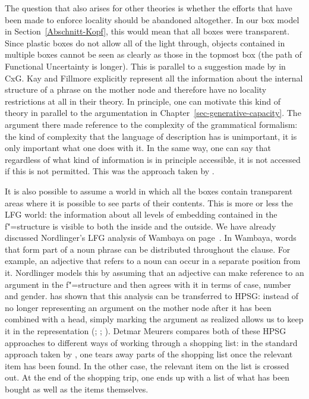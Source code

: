 The question that also arises for other theories is whether the efforts that have been made to enforce locality should be abandoned altogether.
In our box model in Section~\ref{Abschnitt-Kopf}, this would mean that all boxes were transparent. Since plastic boxes do not allow
all of the light through, objects contained in multiple boxes cannot be seen as clearly as those in the topmost box (the path
of Functional Uncertainty is longer). This is parallel to a suggestion made by
\citet{KF99a} in CxG\indexcxg. Kay and Fillmore explicitly represent all the information about the internal structure of a phrase on the mother
node and therefore have no locality restrictions at all in their theory. In principle, one can
motivate this kind of theory in parallel to the argumentation in Chapter~\ref{sec-generative-capacity}. The argument
there made reference to the complexity of the grammatical formalism: the kind of complexity that the
language of description has is unimportant, it is only important what one does with it. In the same way, one can say that regardless of what kind of information
is  in principle accessible, it is not accessed if this is not permitted. This was the approach taken by \citet[--145]{ps}.

It\label{page-Bender-Wambaya-two} is also possible to assume a world in which all the boxes contain transparent areas where it is possible to see parts of their contents.
This is more or less the LFG world\indexlfg: the information about all levels of embedding contained in the f"=structure is
visible to both the inside and the outside. We have already discussed Nordlinger's \citeyearpar{Nordlinger98a-u} LFG analysis of Wambaya 
on page~\pageref{Seite-Bender-Wambaya}.
In Wambaya, words that form part of a noun phrase can be distributed throughout the clause. For example, an adjective that refers to a noun
can occur in a separate position from it. Nordlinger models this by assuming that an adjective can make reference to an argument in the f"=structure
and then agrees with it in terms of case, number and gender. \citet{Bender2008a} has shown that this analysis can be transferred to HPSG\indexhpsg:
instead of no longer representing an argument on the mother node after it has been combined with a head, simply marking the argument as realized
allows us to keep it in the representation (\citealp{Meurers99b}; \citealp{Prze99};
\citealp[Section~17.4]{MuellerLehrbuch1}). Detmar Meurers compares both of these HPSG approaches to different ways of working through a shopping list: in the standard approach taken by \citet{ps2},
one tears away parts of the shopping list once the relevant item has been found. In the other case, the relevant item on the list is crossed out.
At the end of the shopping trip, one ends up with a list of what has been bought as well as the items themselves.
  
